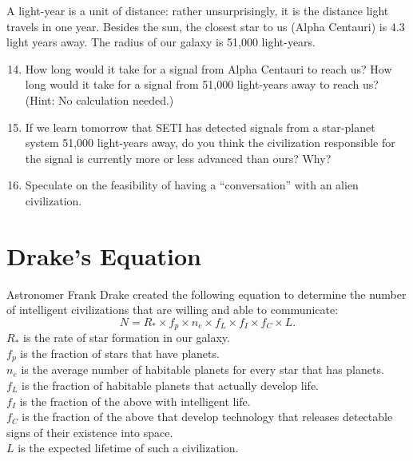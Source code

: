 \documentclass[12pt]{article}%
\begin{document}
A light-year is a unit of distance: rather unsurprisingly, it is the distance light travels in one year.  
Besides the sun, the closest star to us (Alpha Centauri) is 4.3 light years away.  
The radius of our galaxy is 51,000 light-years.  

\begin{enumerate}
\setcounter{enumi}{13}
\item How long would it take for a signal from Alpha Centauri to reach us?  
How long would it take for a signal from 51,000 light-years away to reach us?  (Hint: No calculation needed.)%
\item  If we learn tomorrow that SETI has detected signals from a star-planet system 51,000 light-years away, do you think the civilization responsible for the signal is currently more or less advanced than ours?  Why? %

\item Speculate on the feasibility of having a ``conversation'' with an alien civilization. 

\end{enumerate}


\section{Drake's Equation}

Astronomer Frank Drake created the following equation to determine the number of intelligent civilizations that are willing and able to communicate:
$$ N = R_{*} \times f_{p} \times n_{e} \times f_{L} \times f_{I} \times f_{C} \times L. $$
$R_{*}$ is the rate of star formation in our galaxy.
\\
$f_{p}$ is the fraction of stars that have planets.
\\
$n_{e}$ is the average number of habitable planets for every star that has planets.
\\
$f_{L}$ is the fraction of habitable planets that actually develop life.
\\
$f_{I}$ is the fraction of the above with intelligent life.
\\
$f_{C}$ is the fraction of the above that develop technology that releases detectable signs of their existence into space.
\\
$L$ is the expected lifetime of such a civilization.
\end{document}
